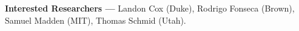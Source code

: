 \item \textbf{Interested Researchers ---} Landon Cox (Duke), Rodrigo Fonseca (Brown), Samuel Madden (MIT), Thomas Schmid (Utah).

